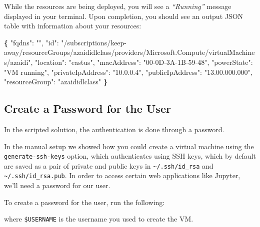 \documentclass[]{book}
\newenvironment{Shaded}{\begin{snugshade}}{\end{snugshade}}
\newcommand{\KeywordTok}[1]{\textcolor[rgb]{0.13,0.29,0.53}{\textbf{#1}}}
\newcommand{\StringTok}[1]{\textcolor[rgb]{0.31,0.60,0.02}{#1}}
\newcommand{\FunctionTok}[1]{\textcolor[rgb]{0.00,0.00,0.00}{#1}}
\newcommand{\VariableTok}[1]{\textcolor[rgb]{0.00,0.00,0.00}{#1}}
\newcommand{\NormalTok}[1]{#1}
\theoremstyle{definition}
\theoremstyle{definition}
\theoremstyle{definition}
\theoremstyle{remark}
\begin{document}
While the resources are being deployed, you will see a
\emph{``Running''} message displayed in your terminal. Upon completion,
you should see an output JSON table with information about your
resources:

\begin{Shaded}
\begin{Highlighting}[]
\KeywordTok{\{}
  \StringTok{"fqdns"}\NormalTok{: }\StringTok{""}\NormalTok{,}
  \StringTok{"id"}\NormalTok{: }\StringTok{"/subscriptions/keep-away/resourceGroups/azaididlclass/providers/Microsoft.Compute/virtualMachines/azaidi"}\NormalTok{,}
  \StringTok{"location"}\NormalTok{: }\StringTok{"eastus"}\NormalTok{,}
  \StringTok{"macAddress"}\NormalTok{: }\StringTok{"00-0D-3A-1B-59-48"}\NormalTok{,}
  \StringTok{"powerState"}\NormalTok{: }\StringTok{"VM running"}\NormalTok{,}
  \StringTok{"privateIpAddress"}\NormalTok{: }\StringTok{"10.0.0.4"}\NormalTok{,}
  \StringTok{"publicIpAddress"}\NormalTok{: }\StringTok{"13.00.000.000"}\NormalTok{,}
  \StringTok{"resourceGroup"}\NormalTok{: }\StringTok{"azaididlclass"}
\KeywordTok{\}}
\end{Highlighting}
\end{Shaded}

\subsection{Create a Password for the
User}\label{create-a-password-for-the-user}

In the scripted solution, the authentication is done through a password.

In the manual setup we showed how you could create a virtual machine
using the \texttt{generate-ssh-keys} option, which authenticates using
SSH keys, which by default are saved as a pair of private and public
keys in \texttt{\textasciitilde{}/.ssh/id\_rsa} and
\texttt{\textasciitilde{}/.ssh/id\_rsa.pub}. In order to access certain
web applications like Jupyter, we'll need a password for our user.

To create a password for the user, run the following:

\begin{Shaded}
\end{Shaded}

where \texttt{\$USERNAME} is the username you used to create the VM.
\end{document}
